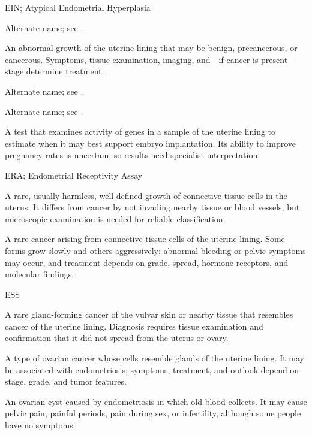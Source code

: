 \synonyms
EIN; Atypical Endometrial Hyperplasia

 Alternate name; see .

 An abnormal growth of the uterine lining that may be benign, precancerous, or cancerous. Symptoms, tissue examination, imaging, and—if cancer is present—stage determine treatment.

 Alternate name; see .

 Alternate name; see .

 A test that examines activity of genes in a sample of the uterine lining to estimate when it may best support embryo implantation. Its ability to improve pregnancy rates is uncertain, so results need specialist interpretation.

\synonyms
ERA; Endometrial Receptivity Assay

 A rare, usually harmless, well-defined growth of connective-tissue cells in the uterus. It differs from cancer by not invading nearby tissue or blood vessels, but microscopic examination is needed for reliable classification.

 A rare cancer arising from connective-tissue cells of the uterine lining. Some forms grow slowly and others aggressively; abnormal bleeding or pelvic symptoms may occur, and treatment depends on grade, spread, hormone receptors, and molecular findings.

\synonyms
ESS

 A rare gland-forming cancer of the vulvar skin or nearby tissue that resembles cancer of the uterine lining. Diagnosis requires tissue examination and confirmation that it did not spread from the uterus or ovary.

 A type of ovarian cancer whose cells resemble glands of the uterine lining. It may be associated with endometriosis; symptoms, treatment, and outlook depend on stage, grade, and tumor features.

 An ovarian cyst caused by endometriosis in which old blood collects. It may cause pelvic pain, painful periods, pain during sex, or infertility, although some people have no symptoms.

